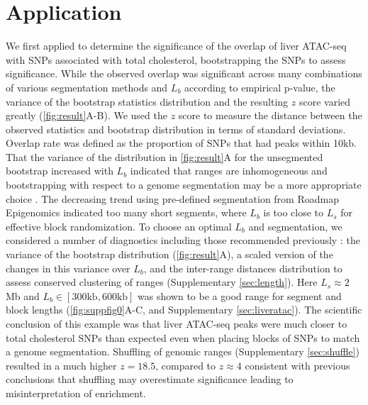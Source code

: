 \vspace*{-.5cm}
\section{Application}

We first applied \bootranges to determine the significance of the
overlap of liver ATAC-seq
\citep{CURRIN20211169} with SNPs associated with total cholesterol,
bootstrapping the SNPs to assess significance.
While the observed overlap was significant across many combinations of
various segmentation methods and $L_b$ according to empirical p-value, 
the variance of the
bootstrap statistics distribution and the resulting $z$ score varied greatly
(\cref{fig:result}A-B).
We used the $z$ score to measure the distance between the observed
statistics and bootstrap distribution in terms of standard deviations.
Overlap rate was defined as the proportion of
SNPs that had peaks within 10kb.
That the variance of the distribution in \cref{fig:result}A for the
unsegmented bootstrap increased with $L_b$ indicated that
ranges are inhomogeneous and
bootstrapping with respect to a genome
segmentation may be a more appropriate choice
\citep{bickel2010subsampling}. 
The decreasing trend using pre-defined segmentation from
Roadmap Epigenomics indicated too many short segments,
where $L_b$ is too close to $L_s$ for effective block randomization.
To choose an optimal $L_b$ and segmentation, 
we considered a number of diagnostics including
those recommended previously \citep{bickel2010subsampling}:
the variance of the bootstrap distribution (\cref{fig:result}A),
a scaled version of the changes in this variance over $L_b$,
and the inter-range distances distribution to assess conserved
clustering of ranges (Supplementary \cref{sec:length}).
Here $L_s \approx 2$ Mb and $L_b \in [300\textrm{kb},600\textrm{kb}]$ was 
shown to be a good range for segment and block
lengths (\cref{fig:suppfig0}A-C, and Supplementary \cref{sec:liveratac}).
The scientific conclusion of this example was that liver ATAC-seq
peaks were
much closer to total cholesterol SNPs than expected even when placing
blocks of SNPs to match a genome segmentation.
Shuffling of genomic ranges (Supplementary \cref{sec:shuffle})
resulted in a much higher $z = 18.5$, compared to $z \approx 4$ 
consistent with previous conclusions that shuffling may 
overestimate significance leading to misinterpretation of enrichment.


